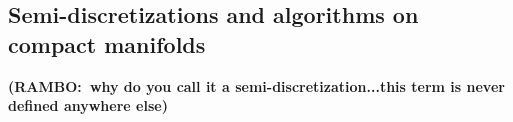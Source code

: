 \documentclass[final,leqno]{siamltex1213}
\newcommand{\ram}[1]{{\normalsize{\textbf{({\color{red}RAMBO:\ }#1)}}}}
\begin{document}
%
%

\subsection{Semi-discretizations and algorithms on compact manifolds}
\ram{why do you call it a semi-discretization...this term is never defined anywhere else}
\end{document}
